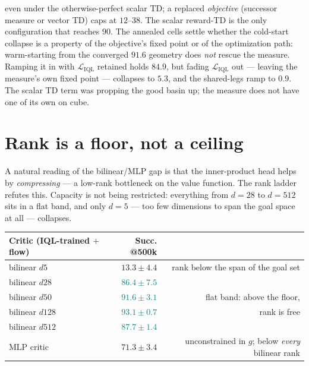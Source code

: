 \documentclass[11pt]{article}
\newcommand{\good}[1]{\textcolor{teal}{#1}}
\newcommand{\bad}[1]{\textcolor{red!70!black}{#1}}
\begin{document}
\begin{table}[h]
{even under the otherwise-perfect scalar TD; a replaced \emph{objective} (successor measure or
vector TD) caps at $12$--$38$. The scalar reward-TD is the only configuration that reaches
$90$. The annealed cells settle whether the cold-start collapse is a property of the
objective's fixed point or of the optimization path: warm-starting from the converged $91.6$
geometry does \emph{not} rescue the measure. Ramping it in with $\mathcal{L}_{\text{IQL}}$
retained holds $84.9$, but fading $\mathcal{L}_{\text{IQL}}$ out --- leaving the measure's own
fixed point --- collapses to $5.3$, and the shared-legs ramp to $0.9$. The scalar TD term was
propping the good basin up; the measure does not have one of its own on cube.}
\label{tab:followup}
\end{table}

\section{Rank is a floor, not a ceiling}
\label{sec:rank}

A natural reading of the bilinear/MLP gap is that the inner-product head helps by
\emph{compressing} --- a low-rank bottleneck on the value function. The rank ladder refutes
this. Capacity is not being restricted: everything from $d{=}28$ to $d{=}512$ sits in a flat
band, and only $d{=}5$ --- too few dimensions to span the goal space at all --- collapses.

\begin{center}\footnotesize
\begin{tabular}{@{}l r r@{}}
\toprule
Critic (IQL-trained $+$ flow) & Succ. @500k & \\
\midrule
bilinear $d5$    & \bad{$13.3\pm4.4$} & rank below the span of the goal set \\
\midrule
bilinear $d28$   & \good{$86.4\pm7.5$} & \\
bilinear $d50$   & \good{$91.6\pm3.1$} & flat band: above the floor, \\
bilinear $d128$  & \good{$93.1\pm0.7$} & rank is free \\
bilinear $d512$  & \good{$87.7\pm1.4$} & \\
\midrule
MLP critic       & $71.3\pm3.4$ & unconstrained in $g$; below \emph{every} bilinear rank \\
\bottomrule
\end{tabular}
\end{center}
\end{document}
